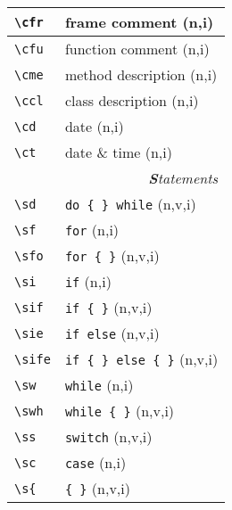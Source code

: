 \documentclass[oneside,10pt,landscape,DIV16]{scrartcl}
\begin{document}
\begin{multicols}{3}
\begin{center}
\begin{tabular}[]{|p{11mm}|p{58mm}|}
\hline \verb'\cfr'& frame comment                           \hfill (n,i)\\
\hline \verb'\cfu'& function comment                        \hfill (n,i)\\
\hline \verb'\cme'& method description                      \hfill (n,i)\\
\hline \verb'\ccl'& class description                       \hfill (n,i)\\
\hline \verb'\cd' & date                                    \hfill (n,i)\\
\hline \verb'\ct' & date \& time                            \hfill (n,i)\\
\hline 
\hline
\multicolumn{2}{|r|}{\textsl{\textbf{S}tatements}} \\
\hline \verb'\sd'  & \verb'do { } while'        \hfill (n,v,i)\\
\hline \verb'\sf'  & \verb'for'                 \hfill (n,i)\\
\hline \verb'\sfo' & \verb'for { }'             \hfill (n,v,i)\\
\hline \verb'\si'  & \verb'if'                  \hfill (n,i)\\
\hline \verb'\sif' & \verb'if { }'              \hfill (n,v,i)\\
\hline \verb'\sie' & \verb'if else'             \hfill (n,v,i)\\
\hline \verb'\sife'& \verb'if { } else { }'     \hfill (n,v,i)\\
\hline \verb'\sw'  & \verb'while'               \hfill (n,i)\\
\hline \verb'\swh' & \verb'while { }'           \hfill (n,v,i)\\
\hline \verb'\ss'  & \verb'switch'              \hfill (n,v,i)\\
\hline \verb'\sc'  & \verb'case'                \hfill (n,i)\\
\hline \verb'\s{'  & \verb'{ }'                 \hfill (n,v,i)\\
\hline
\end{tabular}\\
%
%
\begin{tabular}[]{|p{11mm}|p{58mm}|}

\end{tabular}
\end{center}
\end{multicols}
\end{document}
